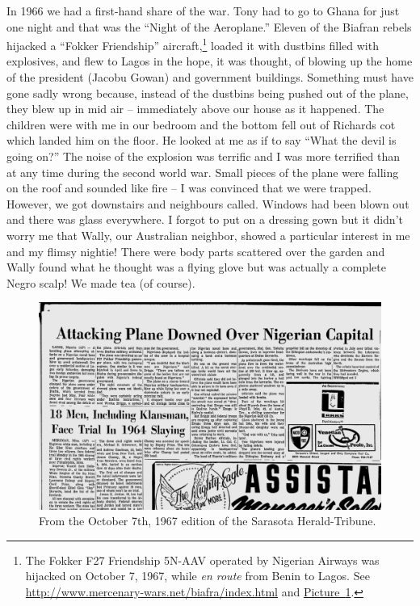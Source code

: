 In 1966 we had a first-hand share of the war. Tony had to go to Ghana
for just one night and that was the ``Night of the Aeroplane.'' Eleven
of the Biafran rebels hijacked a ``Fokker Friendship''
aircraft,\footnote{The Fokker F27 Friendship 5N-AAV operated by
  Nigerian Airways was hijacked on October 7, 1967, while \textit{en
    route} from Benin to Lagos. See
  \href{http://www.mercenary-wars.net/biafra/index.html}{http://www.mercenary-wars.net/biafra/index.html}
  and
  \href{http://news.google.com/newspapers?nid=1774&dat=19671007&id=Pn4fAAAAIBAJ&sjid=6mUEAAAAIBAJ&pg=7328,1581485}{Picture~\ref{hijacking}}.
} loaded it with dustbins filled with explosives, and flew to Lagos in
the hope, it was thought, of blowing up the home of the president
(Jacobu Gowan) and government buildings. Something must have gone
sadly wrong because, instead of the dustbins being pushed out of the
plane, they blew up in mid air -- immediately above our house as it
happened. The children were with me in our bedroom and the bottom fell
out of Richards cot which landed him on the floor. He looked at me as
if to say ``What the devil is going on?'' The noise of the explosion
was terrific and I was more terrified than at any time during the
second world war. Small pieces of the plane were falling on the roof
and sounded like fire -- I was convinced that we were
trapped. However, we got downstairs and neighbours called. Windows had
been blown out and there was glass everywhere. I forgot to put on a
dressing gown but it didn’t worry me that Wally, our Australian
neighbor, showed a particular interest in me and my flimsy nightie!
There were body parts scattered over the garden and Wally found what
he thought was a flying glove but was actually a complete Negro scalp!
We made tea (of course).

\begin{figure}
  \centering
  \includegraphics[width=\textwidth]{photos/nigeria1}
  \caption{From the October 7th, 1967 edition of the Sarasota
    Herald-Tribune.}
  \label{hijacking}
\end{figure}

